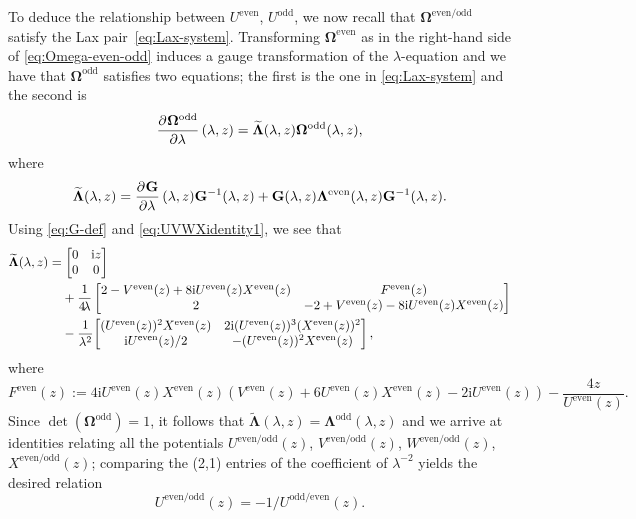 \documentclass[11pt]{article}
\numberwithin{equation}{section}
\numberwithin{equation}{section}
\newcommand{\ii}{\mathrm{i}}
\begin{document}
To deduce the relationship between $U^{\mathrm{even}}$, $U^{\mathrm{odd}}$, we now recall that $\mathbf{\Omega}^{\mathrm{even/odd}}$ satisfy the Lax pair~\eqref{eq:Lax-system}. Transforming $\mathbf{\Omega}^{\mathrm{even}}$ as in the right-hand side of \eqref{eq:Omega-even-odd} induces a gauge transformation of the $\lambda$-equation and we have that $\mathbf{\Omega}^{\mathrm{odd}}$ satisfies two equations; the first is the one in \eqref{eq:Lax-system} and the second is
\[
\dpd{\mathbf{\Omega}^{\mathrm{odd}}}{\lambda}(\lambda, z) = \widetilde{\mathbf{\Lambda}}(\lambda, z) \mathbf{\Omega}^{\mathrm{odd}}(\lambda, z),
\]
where
\[
\widetilde{\mathbf{\Lambda}}(\lambda, z) = \dpd{\mathbf{G}}{\lambda}(\lambda, z) \mathbf{G}^{-1}(\lambda, z) + \mathbf{G}(\lambda, z) \mathbf{\Lambda}^{\mathrm{even}}(\lambda, z)\mathbf{G}^{-1}(\lambda, z).
\]
Using \eqref{eq:G-def} and \eqref{eq:UVWXidentity1}, we see that
\begin{align*}
& \widetilde{\mathbf{\Lambda}}(\lambda, z) = \begin{bmatrix} 0 & \ii z \\ 0 & 0 \end{bmatrix}\\
 & \hphantom{\widetilde{\mathbf{\Lambda}}(\lambda, z) =}{}
 + \dfrac{1}{4 \!\lambda}\begin{bmatrix} 2 - V^{\mathrm{even}}(z) + 8\ii U^{\mathrm{even}}(z)X^{\mathrm{even}}(z) & F^\mathrm{even}(z) \\ 2 & -2 + V^{\mathrm{even}}(z) - 8\ii U^{\mathrm{even}}(z)X^{\mathrm{even}}(z) \end{bmatrix} \\
 & \hphantom{\widetilde{\mathbf{\Lambda}}(\lambda, z) =}{} -\dfrac{1}{\lambda^2} \!\begin{bmatrix} (U^{\mathrm{even}}(z))^2 X^{\mathrm{even}}(z) & 2\ii (U^{\mathrm{even}}(z))^3(X^{\mathrm{even}}(z))^2 \\ \ii U^{\mathrm{even}}(z)/2 & - (U^{\mathrm{even}}(z))^2 X^{\mathrm{even}}(z)\end{bmatrix},
\end{align*}
where
\[
F^\mathrm{even}(z) := 4\ii U^{\mathrm{even}}(z) X^{\mathrm{even}}(z) \left(V^{\mathrm{even}}(z) + 6 U^{\mathrm{even}}(z) X^{\mathrm{even}}(z)-2 \ii U^{\mathrm{even}}(z) \right)- \dfrac{4z}{ U^{\mathrm{even}}(z)}.
\]
Since $\det(\mathbf{\Omega}^\mathrm{odd}) = 1$, it follows that $\widetilde{\mathbf{\Lambda}}(\lambda, z) = \mathbf{\Lambda}^{\mathrm{odd}}(\lambda, z)$ and we arrive at identities relating all the potentials $U^{\mathrm{even/odd}}(z)$, $V^{\mathrm{even/odd}}(z)$, $W^{\mathrm{even/odd}}(z)$, $X^{\mathrm{even/odd}}(z)$; comparing the (2,1) entries of the coefficient of $\lambda^{-2}$ yields the desired relation
\[
U^{\mathrm{even/odd}}(z) = -1/U^{\mathrm{odd/even}}(z).
\]
\end{document}
